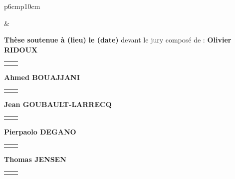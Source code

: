 \documentclass[10pt]{book}
\begin{document}
\begin{titlepage}
\begin{center}
\begin{minipage}{\glarg}
\begin{tabular}{p{6cm}p{10cm}}
\begin{minipage}{\plarg}
\hspace{-1.8cm}{\huge\bf  modèle}
\end{minipage}
&
\begin{minipage}{\plarg}
{\large\bf Th\`ese soutenue \`a (lieu)\vspace{1mm}\newline}
{\large\bf le (date)\vspace{2mm}\newline}
{\large devant le jury compos\'e de : \vspace{2mm}\newline}
{\Large\bf Olivier RIDOUX\vspace{0mm}\newline}
{\begin{tabular}{lr}
    \hspace{-2mm}{Professeur à l'université~Rennes~1}  & \hspace{2cm}{pr\'esident}
  \end{tabular}\newline}

{\Large\bf Ahmed BOUAJJANI\vspace{0mm}\newline}
{\begin{tabular}{lr}
    \hspace{-2mm}{Professeur à l'université~Paris~7} & \hspace{2.05cm}{rapporteur}
  \end{tabular}\newline}

{\Large\bf Jean GOUBAULT-LARRECQ\vspace{0mm}\newline}
{\begin{tabular}{lr}
    \hspace{-2mm}{Professeur à l'ENS~Cachan} & \hspace{2.8cm}{rapporteur}
  \end{tabular}\newline}

{\Large\bf Pierpaolo DEGANO\vspace{0mm}\newline}
{\begin{tabular}{lr}
    \hspace{-2mm}{Professeur à l'Università~di~Pisa} & \hspace{1.75cm}{examinateur}
  \end{tabular}\newline}

{\Large\bf Thomas JENSEN\vspace{0mm}\newline}
{\begin{tabular}{lr}
    \hspace{-2mm}{Directeur de Recherche à l'INRIA} & \hspace{.65cm}{directeur de th\`ese}
  \end{tabular}\newline}


\end{minipage}
\end{tabular}
\end{minipage}
\end{center}
\end{titlepage}
\end{document}
